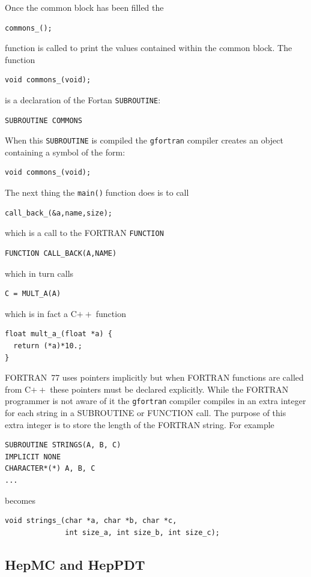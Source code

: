 \documentclass[11pt,a4paper]{scrartcl}
\def\cpp{C$++\;$}
\def\main{\texttt{main()}$\;$}
\begin{document}
Once the common block has been filled the 
% 
\begin{verbatim}
commons_();
\end{verbatim}
%
function is called to print the values contained within the common
block.  The function 
% 
\begin{verbatim}
void commons_(void);
\end{verbatim}
%
is a declaration of the Fortan \texttt{SUBROUTINE}:
\begin{verbatim}
SUBROUTINE COMMONS
\end{verbatim}
When this \texttt{SUBROUTINE} is compiled the \texttt{gfortran} compiler
creates an object containing a symbol of the form:
\begin{verbatim}
void commons_(void);
\end{verbatim}
%
The next thing the \main function does is to call
% 
\begin{verbatim}
call_back_(&a,name,size);
\end{verbatim}
%
which is a call to the FORTRAN \texttt{FUNCTION}
\begin{verbatim}
FUNCTION CALL_BACK(A,NAME)
\end{verbatim}
which in turn calls
%
\begin{verbatim}
C = MULT_A(A)
\end{verbatim}
%
which is in fact a \cpp function
\begin{verbatim}
float mult_a_(float *a) {
  return (*a)*10.;
}
\end{verbatim}
FORTRAN~77 uses pointers implicitly but when FORTRAN functions are
called from \cpp these pointers must be declared explicitly.  While the
FORTRAN programmer is not aware of it the \texttt{gfortran} compiler
compiles in an extra integer for each string in a SUBROUTINE or
FUNCTION call.  The purpose of this extra integer is to store the
length of the FORTRAN string.  For example
%
\begin{verbatim}
SUBROUTINE STRINGS(A, B, C)
IMPLICIT NONE
CHARACTER*(*) A, B, C
...
\end{verbatim}
%
becomes
\begin{verbatim}
void strings_(char *a, char *b, char *c, 
              int size_a, int size_b, int size_c);
\end{verbatim}


\subsection{HepMC and HepPDT}
\end{document}
